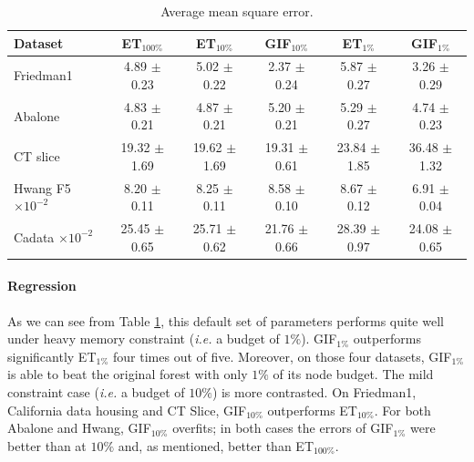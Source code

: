 \documentclass{article}
\newcommand{\bestA}{\cellcolor{orange}}
\newcommand{\bestB}{\cellcolor{dodgerblue}}
\begin{document}
\begin{table}[t]
\caption{Average mean square error.}
\label{tab:reg}
\vskip 0.15in
\begin{center}
\begin{small}
\begin{sc}
\begin{tabular}{l|c|cc|cc}
\hline
Dataset & ET$_{100\%}$ & ET$_{10\%}$ & GIF$_{10\%}$ & ET$_{1\%}$ & GIF$_{1\%}$\\
\hline
Friedman1 & 4.89 $\pm$ 0.23 & 5.02 $\pm$ 0.22 & \bestA 2.37 $\pm$ 0.24 & 5.87 
$\pm$ 0.27 & \bestB 3.26 $\pm$ 0.29 \\
Abalone & 4.83 $\pm$ 0.21 & \bestA 4.87 $\pm$ 0.21 & 5.20 $\pm$ 0.21 & 5.29 
$\pm$ 0.27 & \bestB 4.74 $\pm$ 0.23 \\
CT slice & 19.32 $\pm$ 1.69 & 19.62 $\pm$ 1.69 & \bestA 19.31 $\pm$ 0.61 & 
\bestB 23.84 $\pm$ 1.85 & 36.48 $\pm$ 1.32 \\
Hwang F5 \hfill {\tiny $\times 10^{-2}$} & 8.20 $\pm$ 0.11 & \bestA 8.25 $\pm$ 
0.11 & 8.58 $\pm$ 0.10 & 8.67 $\pm$ 0.12 & \bestB 6.91 $\pm$ 0.04 \\
Cadata \hfill {\tiny $\times 10^{-2}$} & 25.45 $\pm$ 0.65 & 25.71 $\pm$ 0.62 & 
\bestA 21.76 $\pm$ 0.66 & 28.39 $\pm$ 0.97 & \bestB 24.08 $\pm$ 0.65 \\
\hline
\end{tabular}
\end{sc}
\end{small}
\end{center}
\vskip -0.1in
\end{table}

\paragraph{Regression}
As we can see from Table \ref{tab:reg}, this default set of parameters performs 
quite well under heavy memory constraint ({\it i.e.} a budget of $1\%$). 
GIF$_{1\%}$ outperforms significantly ET$_{1\%}$ four times out of five. 
Moreover, on those four datasets, GIF$_{1\%}$ is able to beat the original 
forest with only $1\%$ of its node budget.
The mild constraint case ({\it i.e.} a budget of $10\%$) is more contrasted.
On Friedman1, California data housing and CT Slice, GIF$_{10\%}$ 
outperforms ET$_{10\%}$. For both Abalone and Hwang, GIF$_{10\%}$ overfits; in 
both cases the errors of GIF$_{1\%}$ were better than at $10\%$ and, 
as mentioned, better than ET$_{100\%}$.
\end{document}
